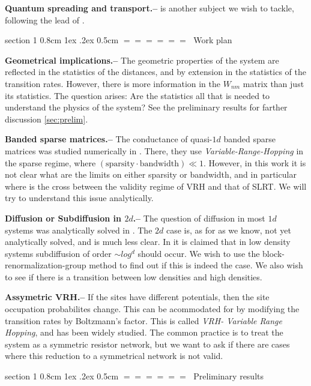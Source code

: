 \documentclass[onecolumn,fleqn,notitlepage,secnumarabic]{revtex4}
\makeatletter
\def\section{%
  \@startsection
    {section}%
    {1}%
    {\z@}%
    {0.8cm \@plus1ex \@minus .2ex}%
    {0.5cm}%
    {\Large\bf $=\!=\!=\!=\!=\!=\;$}%
}%
\makeatother
\begin{document}
{ \bf Quantum spreading and transport.--} is another subject we wish to tackle, following the lead of \cite{Jayannavar:1991}\cite{Guarneri:1989}\cite{Guarneri:1993}.


\section{Work plan}


{ \bf Geometrical implications.-- } The geometric properties of the system are reflected in the statistics of the distances, and by extension in the statistics of the transition rates. However, there is more information in the $W_{nm}$ matrix than just its statistics. The question arises: Are the statistics all that is needed to understand the physics of the system? See the preliminary results for farther discussion \ref{sec:prelim}.

{ \bf Banded sparse matrices.-- } The conductance of quasi-$1d$ banded sparse matrices was studied numerically in \cite{Stotland:2010:PRB}. There, they use \emph{Variable-Range-Hopping} in the sparse regime, where 
$(\text{sparsity}\cdot \text{bandwidth}) \ll 1$. However, in this work it is not clear what are the limits on either sparsity or bandwidth, and in particular where is the cross between the validity regime of VRH and that of SLRT. We will try to understand this issue analytically.

{ \bf Diffusion or Subdiffusion in $2d$.-- } The question of diffusion in most $1d$ systems was analytically solved in \cite{Alexander:1981:RMP}. The $2d$ case is, as for as we know, not yet analytically solved, and is much less clear. In \cite{Amir:2010:PRL} it is claimed that in low density systems subdiffusion of order $\sim log^d$ should occur. We wish to use the block-renormalization-group method to find out if this is indeed the case. We also wish to see if there is a transition between low densities and high densities.

{\bf Assymetric VRH.--} If the sites have different potentials, then the site occupation probabilites change. This can be acommodated for by modifying the transition rates by Boltzmann's factor. This is called \emph{VRH- Variable Range Hopping}\cite{Ambegaokar:1971}, and has been widely studied. The common practice is to treat the system as a symmetric resistor network, but we want to ask if there are cases where this reduction to a symmetrical network is not valid.

\section{Preliminary results} \label{sec:prelim}
\end{document}
